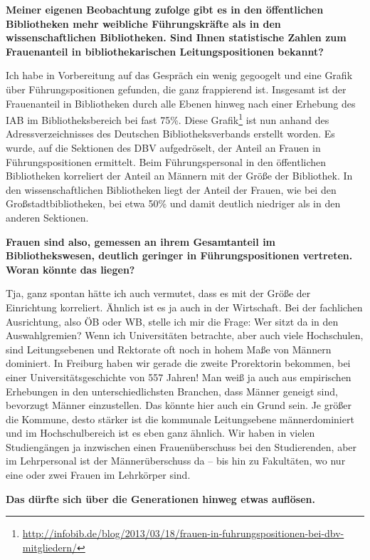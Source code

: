 \documentclass[a4paper,
fontsize=11pt,
oneside,
numbers=noperiodatend,
parskip=half-,
bibliography=totoc,
final
]{scrartcl}
\begin{document}
\textbf{Meiner eigenen Beobachtung zufolge gibt es in den öffentlichen
Bibliotheken mehr weibliche Führungs\-kräfte als in den wissenschaftlichen
Bibliotheken. Sind Ihnen statistische Zahlen zum Frauenanteil in
bibliothekarischen Leitungspositionen bekannt?}

Ich habe in Vorbereitung auf das Gespräch ein wenig gegoogelt und eine
Grafik über Füh\-rungs\-po\-si\-tionen gefunden, die ganz frappierend ist.
Insgesamt ist der Frauenanteil in Bibliotheken durch alle Ebenen hinweg
nach einer Erhebung des IAB im Bibliotheksbereich bei fast 75\%. Diese
Grafik\footnote{\url{http://infobib.de/blog/2013/03/18/frauen-in-fuhrungspositionen-bei-dbv-mitgliedern/}}
ist nun anhand des Adressverzeichnisses des Deutschen
Bibliotheksverbands erstellt worden. Es wurde, auf die Sektionen des DBV
aufgedröselt, der Anteil an Frauen in Füh\-rungs\-po\-si\-tionen ermittelt. Beim
Führungspersonal in den öffentlichen Bibliotheken korreliert der Anteil
an Männern mit der Größe der Bibliothek. In den wissenschaftlichen
Bibliotheken liegt der Anteil der Frauen, wie bei den
Großstadtbibliotheken, bei etwa 50\% und damit deutlich niedriger als in
den anderen Sektionen.

\textbf{Frauen sind also, gemessen an ihrem Gesamtanteil im
Bibliothekswesen, deutlich geringer in Füh\-rungs\-po\-si\-tionen vertreten.
Woran könnte das liegen?}

Tja, ganz spontan hätte ich auch vermutet, dass es mit der Größe der
Einrichtung korreliert. Ähnlich ist es ja auch in der Wirtschaft. Bei
der fachlichen Ausrichtung, also ÖB oder WB, stelle ich mir die Frage:
Wer sitzt da in den Auswahlgremien? Wenn ich Universitäten betrachte,
aber auch viele Hochschulen, sind Leitungsebenen und Rektorate oft noch
in hohem Maße von Männern dominiert. In Freiburg haben wir gerade die
zweite Prorektorin bekommen, bei einer Universitätsgeschichte von 557
Jahren! Man weiß ja auch aus empirischen Erhebungen in den
unterschiedlichsten Branchen, dass Männer geneigt sind, bevorzugt Männer
einzustellen. Das könnte hier auch ein Grund sein. Je größer die
Kommune, desto stärker ist die kommunale Leitungsebene männerdominiert
und im Hochschulbereich ist es eben ganz ähnlich. Wir haben in vielen
Studiengängen ja inzwischen einen Frauenüberschuss bei den Studierenden,
aber im Lehrpersonal ist der Männerüberschuss da -- bis hin zu
Fakultäten, wo nur eine oder zwei Frauen im Lehrkörper sind.

\textbf{Das dürfte sich über die Generationen hinweg etwas auflösen.}
\end{document}

